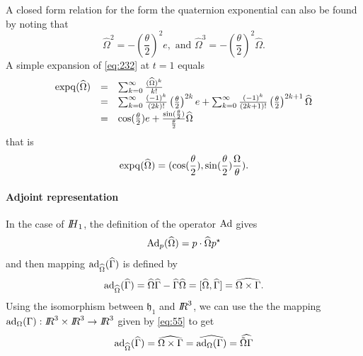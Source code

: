A closed form relation for the form the quaternion exponential can also be found by noting that
\begin{equation}
  \label{eq:140}
  \widehat \Omega ^2  = - \left(\frac \theta 2 \right)^2 e, \text{ and } \widehat \Omega ^3  = - \left(\frac \theta 2 \right)^2 \widehat \Omega.
\end{equation}
A simple expansion of \eqref{eq:232} at $t=1$ equals
\begin{equation}
  \label{eq:141}
  \begin{array}{lcl}
    \operatorname{expq}(\widehat \Omega ) &=& \sum_{k=0}^\infty \frac{(\widehat \Omega)^k}{k!}\\
                            &=& \sum_{k=0}^\infty \frac{(-1)^k}{(2k)!}\left(\frac \theta 2 \right)^{2k} e + \sum_{k=0}^\infty \frac{(-1)^k}{(2k+1)!} \left(\frac \theta 2 \right)^{2k+1} \widehat \Omega \\
                            &=& \cos(\frac \theta 2) e + \frac{\sin(\frac \theta 2)}{\frac \theta 2} \widehat \Omega \\
  \end{array}
\end{equation}
that is
\begin{equation}
  \label{eq:144}
  \operatorname{expq}(\widehat \Omega )  = (\cos(\frac \theta 2), \sin(\frac \theta 2) \frac{\Omega}{\theta}   ).
\end{equation}

\paragraph{Adjoint representation}
In the case of $\mbox{\rm $I\!\!H$}_1$, the definition of the operator $\operatorname{Ad}$ gives
\begin{equation}
  \label{eq:121}
  \operatorname{Ad}_p(\widehat\Omega)  = p\cdot \widehat\Omega p^\star
\end{equation}
 and then mapping $\operatorname{ad}_{\widehat\Omega}(\widehat \Gamma)$ is defined by
\begin{equation}
  \label{eq:56}
  \operatorname{ad}_{\widehat\Omega}(\widehat\Gamma) = \widehat \Omega \widehat\Gamma - \widehat \Gamma \widehat\Omega  =  [\widehat \Omega,\widehat \Gamma] = \widehat{\Omega \times \Gamma}.
\end{equation}
Using the isomorphism between $\mathfrak h_1$ and $\mbox{\rm $I\!\!R$}^3$, we can use the  the mapping $\operatorname{ad}_{\Omega}(\Gamma) : \mbox{\rm $I\!\!R$}^3\times\mbox{\rm $I\!\!R$}^3 \rightarrow \mbox{\rm $I\!\!R$}^3$ given by \eqref{eq:55} to get
\begin{equation}
  \label{eq:145}
   \operatorname{ad}_{\widehat\Omega}(\widehat\Gamma) = \widehat{\Omega \times \Gamma} = \widehat{\operatorname{ad}_{\Omega}(\Gamma)} =  \widehat{\tilde \Omega \Gamma}
\end{equation}

